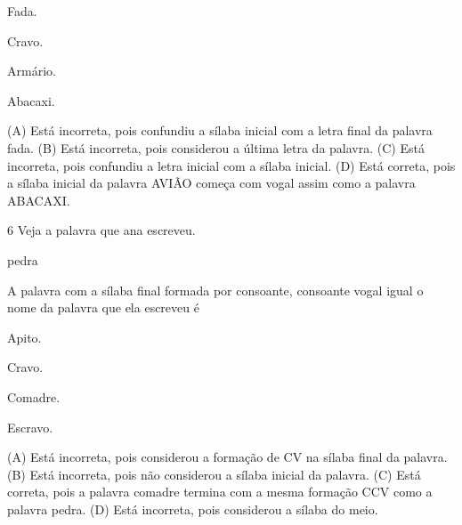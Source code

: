 \begin{minipage}{.5\textwidth}
\begin{escolha}
\item Fada.

\item Cravo.

\item Armário.

\item Abacaxi.
\end{escolha}
\end{minipage}

(A) Está incorreta, pois confundiu a sílaba inicial com a letra final da palavra fada.
(B) Está incorreta, pois considerou a última letra da palavra.
(C) Está incorreta, pois confundiu a letra inicial com a sílaba inicial.
(D) Está correta, pois a sílaba inicial da palavra AVIÃO começa com vogal assim como a palavra ABACAXI.

\num{6} Veja a palavra que ana escreveu.

pedra

A palavra com a sílaba final formada por consoante, consoante vogal
igual o nome da palavra que ela escreveu é

\begin{minipage}{.5\textwidth}
\begin{escolha}
\item Apito.

\item Cravo.

\item Comadre.

\item Escravo.
\end{escolha}
\end{minipage}

(A) Está incorreta, pois considerou a formação de CV na sílaba final da palavra.
(B) Está incorreta, pois não considerou a sílaba inicial da palavra.
(C) Está correta, pois a palavra comadre termina com a mesma formação CCV como a palavra pedra.
(D) Está incorreta, pois considerou a sílaba do meio.

